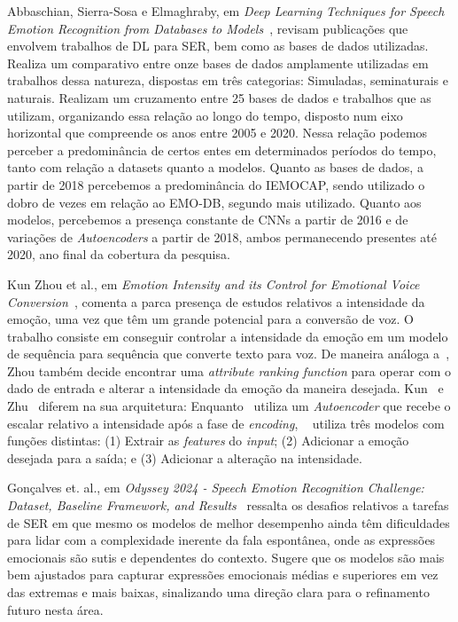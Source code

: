 Abbaschian, Sierra-Sosa e Elmaghraby, em \textit{Deep Learning Techniques for Speech Emotion Recognition from Databases to Models}~\cite{32}, revisam publicações que envolvem trabalhos de \acrshort{DL} para \acrshort{SER}, bem como as bases de dados utilizadas. Realiza um comparativo entre onze bases de dados amplamente utilizadas em trabalhos dessa natureza, dispostas em três categorias: Simuladas, seminaturais e naturais. Realizam um cruzamento entre 25 bases de dados e trabalhos que as utilizam, organizando essa relação ao longo do tempo, disposto num eixo horizontal que compreende os anos entre 2005 e 2020. Nessa relação podemos perceber a predominância de certos entes em determinados períodos do tempo, tanto com relação a datasets quanto a modelos. Quanto as bases de dados, a partir de 2018 percebemos a predominância do IEMOCAP, sendo utilizado o dobro de vezes em relação ao EMO-DB, segundo mais utilizado. Quanto aos modelos, percebemos a presença constante de \acrshort{CNN}s a partir de 2016 e de variações de \textit{Autoencoders} a partir de 2018, ambos permanecendo presentes até 2020, ano final da cobertura da pesquisa.

Kun Zhou et al., em \textit{Emotion Intensity and its Control for Emotional Voice Conversion}~\cite{18}, comenta a parca presença de estudos relativos a intensidade da emoção, uma vez que têm um grande potencial para a conversão de voz. O trabalho consiste em conseguir controlar a intensidade da emoção em um modelo de sequência para sequência que converte texto para voz. De maneira análoga a~\cite{63}, Zhou também decide encontrar uma \textit{attribute ranking function} para operar com o dado de entrada e alterar a intensidade da emoção da maneira desejada. Kun~\cite{18} e Zhu~\cite{63} diferem na sua arquitetura: Enquanto~\cite{63} utiliza um \textit{Autoencoder} que recebe o escalar relativo a intensidade após a fase de \textit{encoding}, ~\cite{18} utiliza três modelos com funções distintas: (1) Extrair as \textit{features} do \textit{input}; (2) Adicionar a emoção desejada para a saída; e (3) Adicionar a alteração na intensidade.

Gonçalves et. al., em \textit{Odyssey 2024 - Speech Emotion Recognition Challenge: Dataset, Baseline Framework, and Results}~\cite{odyssey2024} ressalta os desafios relativos a tarefas de \acrshort{SER} em que mesmo os modelos de melhor desempenho ainda têm dificuldades para lidar com a complexidade inerente da fala espontânea, onde as expressões emocionais são sutis e dependentes do contexto. Sugere que os modelos são mais bem ajustados para capturar expressões emocionais médias e superiores em vez das extremas e mais baixas, sinalizando uma direção clara para o refinamento futuro nesta área.

